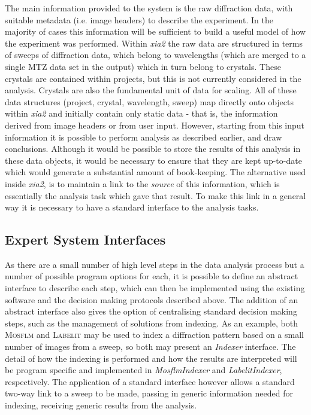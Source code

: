 \documentclass[a4paper, 11pt]{article}
\begin{document}
The main information provided to the system is the raw diffraction
data, with suitable metadata (i.e. image headers) to describe the
experiment. In the majority of
cases this information will be sufficient to build
a useful model of how the experiment was performed. Within \emph{xia2}
the raw data are 
structured in terms of sweeps of diffraction data, which belong to
wavelengths (which are merged to a single MTZ data set in the output)
which in turn belong to crystals. These crystals are contained within
projects, but this is not currently considered in the analysis. Crystals
are also the fundamental unit of data for scaling. All of these
data structures (project, crystal, wavelength, sweep) map directly onto
objects within \emph{xia2} and initially contain only static data -
that is, the information derived from image headers or from user
input. However, starting from this input information it is possible to
perform analysis as described earlier, and draw 
conclusions. Although it would be possible to store the results of
this analysis in these data objects, it would be necessary to ensure
that they are kept up-to-date which would generate a substantial
amount of book-keeping. The alternative used inside
\emph{xia2}, is to maintain a link to the
\emph{source} of this information, which is essentially the analysis
task which gave that result. To make this link in a general
way it is necessary to have a standard interface to the analysis
tasks.

\subsection{Expert System Interfaces}

As there are a small number of high level steps in the data analysis
process but a number of possible program options for each, it is
possible to define an abstract interface to describe each step, which
can then be implemented using the existing software 
and the decision making protocols described above. The addition of an
abstract interface also gives the option of centralising standard
decision making steps, such as the management of solutions from
indexing. As an example, both \textsc{Mosflm} and \textsc{Labelit} may be used to index
a diffraction pattern based on a small number of images from a sweep,
so both may present an \emph{Indexer} interface. The detail of how the
indexing is performed and how the results are interpreted will be
program specific and implemented in \emph{MosflmIndexer} and
\emph{LabelitIndexer}, respectively. The application of a standard
interface however allows a standard two-way link to a sweep to be
made, passing in generic information needed for indexing, receiving
generic results from the analysis.
\end{document}
